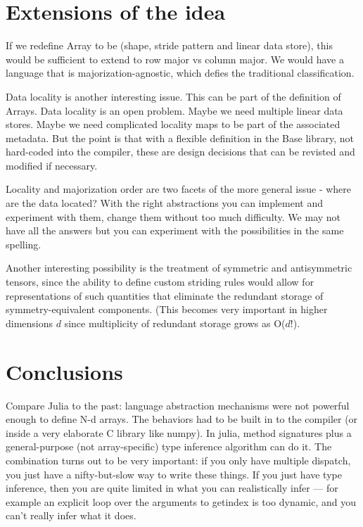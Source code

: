 \documentclass[preprint]{sigplanconf}
\begin{document}
\section{Extensions of the idea}

If we redefine Array to be (shape, stride pattern and linear data store), this
would be sufficient to extend to row major vs column major. We would have a
language that is majorization-agnostic, which defies the traditional
classification.

Data locality is another interesting issue. This can be part of the definition
of Arrays. Data locality is an open problem. Maybe we need multiple linear
data stores. Maybe we need complicated locality maps to be part of the
associated metadata. But the point is that with a flexible definition in the
Base library, not hard-coded into the compiler, these are design decisions
that can be revisted and modified if necessary.

Locality and majorization order are two facets of the more general issue -
where are the data located? With the right abstractions you can implement and
experiment with them, change them without too much difficulty. We may not have
all the answers but you can experiment with the possibilities in the same
spelling.

Another interesting possibility is the treatment of symmetric and
antisymmetric tensors, since the ability to define custom striding rules would
allow for representations of such quantities that eliminate the redundant
storage of symmetry-equivalent components. (This becomes very important in
higher dimensions $d$ since multiplicity of redundant storage grows as
O($d!$).

\section{Conclusions}

Compare Julia to the past: language abstraction mechanisms
were not powerful enough to define N-d arrays. The behaviors had to be
built in to the compiler (or inside a very elaborate C library like
numpy). In julia, method signatures plus a general-purpose (not
array-specific) type inference algorithm can do it. The combination
turns out to be very important: if you only have multiple dispatch,
you just have a nifty-but-slow way to write these things. If you just
have type inference, then you are quite limited in what you can
realistically infer --- for example an explicit loop over the
arguments to getindex is too dynamic, and you can't really infer what
it does.
\end{document}
